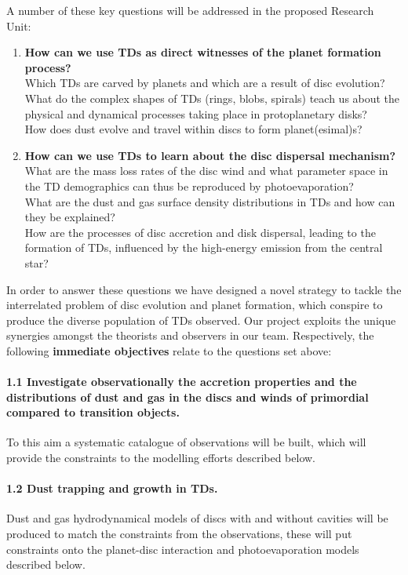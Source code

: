 \documentclass[12pt]{article}
\begin{document}
A number of these key questions will be addressed in the proposed
Research Unit: 

\begin{enumerate}
\item {\bf How can we use TDs as direct witnesses of the planet formation process?}\\ Which TDs are carved by planets and which are a result of disc evolution? \\ What do the complex shapes of TDs (rings, blobs, spirals) teach us about the physical and
dynamical processes taking place in protoplanetary disks?\\ How does
dust evolve and travel within discs to form planet(esimal)s?

\item {\bf How can we use TDs to learn about the disc dispersal
    mechanism?}\\ What are the mass loss rates of the disc wind and
  what parameter space in the TD demographics can thus be reproduced
  by photoevaporation?\\ What are the dust and gas surface density
  distributions in TDs and how can they be
  explained?\\How are the processes of disc accretion and disk
  dispersal, leading to the formation of TDs,
influenced by the high-energy emission from the central star?
\end{enumerate}

In order to answer these questions we have designed a novel strategy
to tackle the interrelated problem of disc evolution and planet
formation, which conspire to produce the diverse population of TDs
observed. Our project exploits the unique synergies amongst the theorists
and observers in our team. Respectively, the following {\bf immediate objectives} relate to the questions set above: 
\paragraph {1.1 Investigate observationally the accretion properties
  and the distributions of dust and gas in the discs and winds of
  primordial compared to transition objects.} To this aim a systematic catalogue of observations will be built, which will provide the constraints to the modelling efforts described below. 
\paragraph{1.2 Dust trapping and growth in TDs.} Dust and
gas hydrodynamical models of discs with and without cavities will be produced to match the
constraints from the observations, these will put constraints onto the
planet-disc interaction and photoevaporation models described below. 
\end{document}

